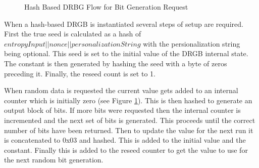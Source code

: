 \documentclass[sigconf]{acmart}
\begin{document}
\begin{figure}[h]
\caption{Hash Based DRBG Flow for Bit Generation Request\cite{barker2015nist90a}}
\label{fig:DRBG}
\end{figure}

When a hash-based DRGB is instantiated several steps of setup are required\cite{barker2015nist90a}. First the true seed is calculated as a hash of \\$entropyInput || nonce || personalizationString$ with the persionalization string being optional. This seed is set to the initial value of the DRGB internal state. The constant is then generated by hashing the seed with a byte of zeros preceding it. Finally, the reseed count is set to 1. 

When random data is requested the current value gets added to an internal counter which is initially zero (see Figure \ref{fig:DRBG}). This is then hashed to generate an output block of bits. If more bits were requested then the internal counter is incremented and the next set of bits is generated. This proceeds until the correct number of bits have been returned. Then to update the value for the next run it is concatenated to 0x03 and hashed. This is added to the initial value and the constant. Finally this is added to the reseed counter to get the value to use for the next random bit generation. 
\end{document}
